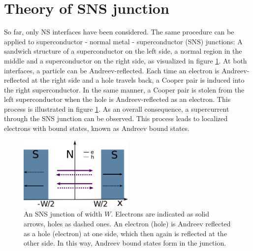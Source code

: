 \section{Theory of SNS junction}\label{sec:theory-sns}
So far, only NS interfaces have been considered. The same procedure can be applied to superconductor - normal metal - superconductor (SNS) junctions: A sandwich structure of a superconductor on the left side, a normal region in the middle and a superconductor on the right side, as visualized in figure \ref{fig:sns-junction}. At both interfaces, a particle can be Andreev-reflected.
Each time an electron is Andreev-reflected at the right side and a hole travels back, a Cooper pair is induced into the right superconductor. In the same manner, a Cooper pair is stolen from the left superconductor when the hole is Andreev-reflected as an electron. This process is illustrated in figure \ref{fig:sns-junction}. As an overall consequence, a supercurrent through the SNS junction can be observed. This process leads to localized electrons with bound states, known as Andreev bound states.
\begin{figure}
\centering
\includegraphics[width=0.5\textwidth]{figure/framework-analytical/sns}
\caption{An SNS junction of width $W$. Electrons are indicated as solid arrows, holes as dashed ones. An electron (hole) is Andreev reflected as a hole (electron) at one side, which then again is reflected at the other side. In this way, Andreev bound states form in the junction.}\label{fig:sns-junction}
\end{figure}



